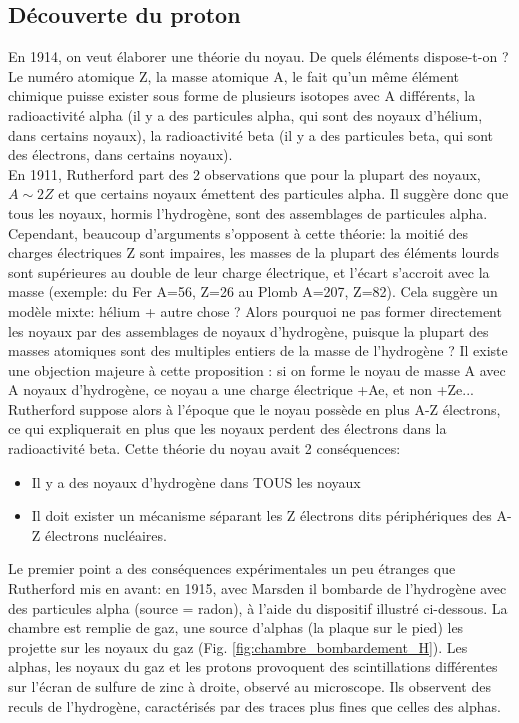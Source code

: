 \subsection{Découverte du proton}
En 1914, on veut élaborer une théorie du noyau. De quels éléments dispose-t-on ? Le numéro atomique Z, la masse atomique A, le fait qu'un même élément chimique puisse exister sous forme de plusieurs isotopes avec A différents, la radioactivité alpha (il y a des particules alpha, qui sont des noyaux d'hélium, dans certains noyaux), la radioactivité beta (il y a des particules beta, qui sont des électrons, dans certains noyaux). \\
En 1911, Rutherford part des 2 observations que pour la plupart des noyaux, $A \sim 2Z$ et que certains noyaux émettent des particules alpha. Il suggère donc que tous les noyaux, hormis l'hydrogène, sont des assemblages de particules alpha. \\
Cependant, beaucoup d'arguments s'opposent à cette théorie: la moitié des charges électriques Z sont impaires, les masses de la plupart des éléments lourds sont supérieures au double de leur charge électrique, et l'écart s'accroit avec la masse (exemple: du Fer A=56, Z=26 au Plomb A=207, Z=82).  Cela suggère un modèle mixte: hélium + autre chose ? Alors pourquoi ne pas former directement les noyaux par des assemblages de noyaux d'hydrogène, puisque la plupart des masses atomiques sont des multiples entiers de la masse de l'hydrogène ? Il existe une objection majeure à cette proposition : si on forme le noyau de masse A avec A noyaux d'hydrogène, ce noyau a une charge électrique +Ae, et non +Ze... Rutherford suppose alors à l'époque que le noyau possède en plus A-Z électrons, ce qui expliquerait en plus que les noyaux perdent des électrons dans la radioactivité beta. Cette théorie du noyau avait 2 conséquences:

\begin{itemize}
    \item Il y a des noyaux d'hydrogène dans TOUS les noyaux
    \item Il doit exister un mécanisme séparant les Z électrons dits périphériques des A-Z électrons nucléaires.
\end{itemize}

Le premier point a des conséquences expérimentales un peu étranges que Rutherford mis en avant: en 1915, avec Marsden il bombarde de l'hydrogène avec des particules alpha (source = radon), à l'aide du dispositif illustré ci-dessous. La chambre est remplie de gaz, une source d’alphas (la plaque sur le pied) les projette sur les noyaux du gaz (Fig. \ref{fig:chambre_bombardement_H}). Les alphas, les noyaux du gaz et les protons  provoquent des scintillations différentes sur l’écran de sulfure de zinc à droite, observé au microscope. Ils observent des reculs de l'hydrogène, caractérisés par des traces plus fines que celles des alphas.


